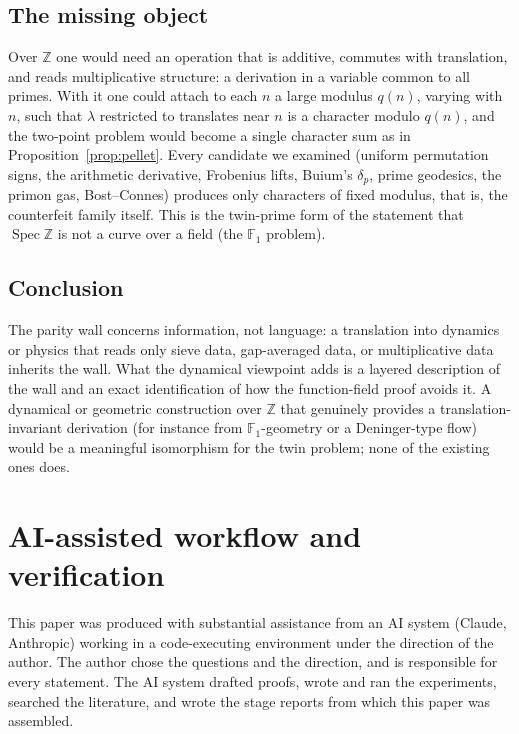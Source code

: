 \documentclass[11pt]{amsart}
\theoremstyle{definition}
\theoremstyle{remark}
\newcommand{\Z}{\mathbb{Z}}
\newcommand{\F}{\mathbb{F}}
\begin{document}
\subsection{The missing object}
Over $\Z$ one would need an operation that is additive, commutes with translation, and reads multiplicative structure: a derivation in a variable common to all primes. With it one could attach to each $n$ a large modulus $q(n)$, varying with $n$, such that $\lambda$ restricted to translates near $n$ is a character modulo $q(n)$, and the two-point problem would become a single character sum as in Proposition~\ref{prop:pellet}. Every candidate we examined (uniform permutation signs, the arithmetic derivative, Frobenius lifts, Buium's $\delta_p$, prime geodesics, the primon gas, Bost--Connes) produces only characters of fixed modulus, that is, the counterfeit family itself. This is the twin-prime form of the statement that $\operatorname{Spec}\Z$ is not a curve over a field (the $\F_1$ problem).

\subsection{Conclusion}
The parity wall concerns information, not language: a translation into dynamics or physics that reads only sieve data, gap-averaged data, or multiplicative data inherits the wall. What the dynamical viewpoint adds is a layered description of the wall and an exact identification of how the function-field proof avoids it. A dynamical or geometric construction over $\Z$ that genuinely provides a translation-invariant derivation (for instance from $\F_1$-geometry or a Deninger-type flow) would be a meaningful isomorphism for the twin problem; none of the existing ones does.

\appendix
\section{AI-assisted workflow and verification}\label{app:ai}

This paper was produced with substantial assistance from an AI system (Claude, Anthropic) working in a code-executing environment under the direction of the author. The author chose the questions and the direction, and is responsible for every statement. The AI system drafted proofs, wrote and ran the experiments, searched the literature, and wrote the stage reports from which this paper was assembled.
\end{document}
